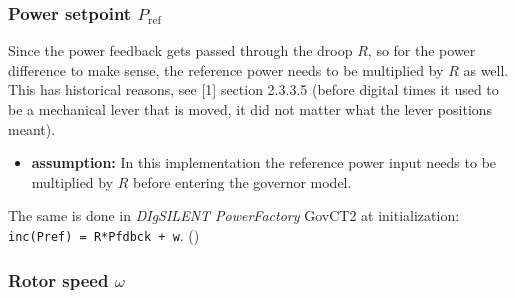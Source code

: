 \documentclass[
  a4paper,
  DIV=11,
  numbers=noendperiod]{scrartcl}
\providecommand{\tightlist}{%
  \setlength{\itemsep}{0pt}\setlength{\parskip}{0pt}}\usepackage{longtable,booktabs,array}
\begin{document}
\subsubsection{\texorpdfstring{Power setpoint
\(P_\mathrm{ref}\)}{Power setpoint P\_\textbackslash mathrm\{ref\}}}\label{power-setpoint-p_mathrmref}

Since the power feedback gets passed through the droop \(R\), so for the
power difference to make sense, the reference power needs to be
multiplied by \(R\) as well. This has historical reasons, see {[}1{]}
section 2.3.3.5 (before digital times it used to be a mechanical lever
that is moved, it did not matter what the lever positions meant).

\begin{itemize}
\tightlist
\item
  \textbf{assumption:} In this implementation the reference power input
  needs to be multiplied by \(R\) before entering the governor model.
\end{itemize}

The same is done in \emph{DIgSILENT PowerFactory} GovCT2 at
initialization: \texttt{inc(Pref)\ =\ R*Pfdbck\ +\ w}. ()

\subsubsection{\texorpdfstring{Rotor speed
\(\omega\)}{Rotor speed \textbackslash omega}}\label{rotor-speed-omega}
\end{document}
